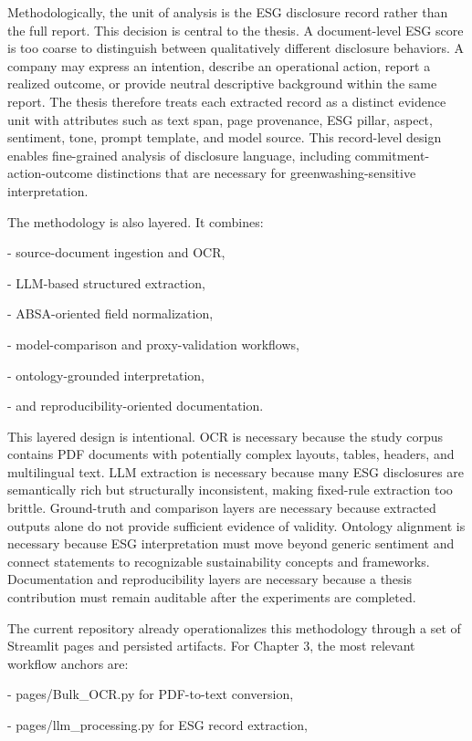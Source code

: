 \documentclass{article}
\begin{document}
Methodologically, the unit of analysis is the ESG disclosure record rather than the full report. This decision is central to the thesis. A document-level ESG score is too coarse to distinguish between qualitatively different disclosure behaviors. A company may express an intention, describe an operational action, report a realized outcome, or provide neutral descriptive background within the same report. The thesis therefore treats each extracted record as a distinct evidence unit with attributes such as text span, page provenance, ESG pillar, aspect, sentiment, tone, prompt template, and model source. This record-level design enables fine-grained analysis of disclosure language, including commitment-action-outcome distinctions that are necessary for greenwashing-sensitive interpretation.

The methodology is also layered. It combines:

- source-document ingestion and OCR,

- LLM-based structured extraction,

- ABSA-oriented field normalization,

- model-comparison and proxy-validation workflows,

- ontology-grounded interpretation,

- and reproducibility-oriented documentation.

This layered design is intentional. OCR is necessary because the study corpus contains PDF documents with potentially complex layouts, tables, headers, and multilingual text. LLM extraction is necessary because many ESG disclosures are semantically rich but structurally inconsistent, making fixed-rule extraction too brittle. Ground-truth and comparison layers are necessary because extracted outputs alone do not provide sufficient evidence of validity. Ontology alignment is necessary because ESG interpretation must move beyond generic sentiment and connect statements to recognizable sustainability concepts and frameworks. Documentation and reproducibility layers are necessary because a thesis contribution must remain auditable after the experiments are completed.

The current repository already operationalizes this methodology through a set of Streamlit pages and persisted artifacts. For Chapter 3, the most relevant workflow anchors are:

- pages/Bulk\_OCR.py for PDF-to-text conversion,

- pages/llm\_processing.py for ESG record extraction,
\end{document}

